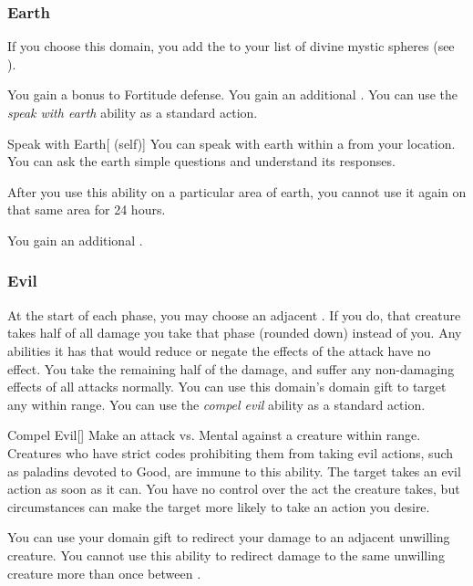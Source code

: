         \subsubsection{Earth}
            If you choose this domain, you add the   to your list of divine mystic spheres (see ).

             You gain a  bonus to Fortitude defense.
             You gain an additional .
             You can use the \textit{speak with earth} ability as a standard action.
            \begin{attuneability}{Speak with Earth}[ (self)]
                You can speak with earth within a \areahuge {} from your location.
                You can ask the earth simple questions and understand its responses.

                After you use this ability on a particular area of earth, you cannot use it again on that same area for 24 hours.
            \end{attuneability}
             You gain an additional .

        \subsubsection{Evil}
             At the start of each phase, you may choose an adjacent .
            If you do, that creature takes half of all damage you take that phase (rounded down) instead of you.
            Any abilities it has that would reduce or negate the effects of the attack have no effect.
            You take the remaining half of the damage, and suffer any non-damaging effects of all attacks normally.
             You can use this domain's domain gift to target any  within \rngclose range.
             You can use the \textit{compel evil} ability as a standard action.
            \begin{freeability}{Compel Evil}[]
                Make an attack vs. Mental against a creature within \rngmed range.
                Creatures who have strict codes prohibiting them from taking evil actions, such as paladins devoted to Good, are immune to this ability.
                \hit The target takes an evil action as soon as it can.
                You have no control over the act the creature takes, but circumstances can make the target more likely to take an action you desire.
            \end{freeability}
             You can use your domain gift to redirect your damage to an adjacent unwilling creature.
            You cannot use this ability to redirect damage to the same unwilling creature more than once between .

